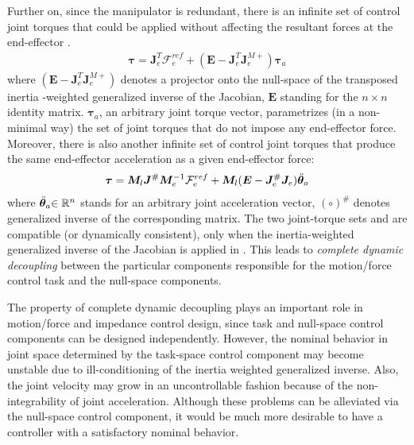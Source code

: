 Further on, since the manipulator is redundant, there is an infinite set of control joint torques
that could be applied without affecting the resultant forces at the end-effector \cite{Khatib1987}.
%
\begin{align}
  \bm{\tau} = \bm{J}_{e}^{T}\mathcal{F}_{e}^{ref} + (\bm{E} - \bm{J}_{e}^{T}\bm{J}_{e}^{M+})\bm{\tau}_{a}\label{eq:TAU_OS1}
\end{align}
%
where $(\bm{E} - \bm{J}_{e}^{T}\bm{J}_{e}^{M+})$ denotes a projector onto the null-space of the transposed
inertia -weighted generalized inverse of the Jacobian, $\bm{E}$ standing for
the $n \times n$ identity matrix.
$\bm{\tau}_{a}$, an arbitrary joint torque vector,
parametrizes (in a non-minimal way) the set of joint torques that do not impose
any end-effector force.
Moreover, there is also another infinite set of control joint torques that produce the same
end-effector acceleration as a given end-effector force:
%
\begin{align}
  \bm{\tau} = \bm{M}_{l}\bm{J}^{\#}\bm{M}_{e}^{-1}\mathcal{F}_{e}^{ref} +
  \bm{M}_{l}(\bm{E} - \bm{J}_{e}^{\#}\bm{J}_{e}){\ddot{\bm{\theta}}}_{a}\label{eq:TAU_OS2}
\end{align}
%
where ${\ddot{\bm{\theta}}}_{a}{\in\mathbb{R}^{n}}$ stands for an arbitrary joint acceleration vector,
$(\circ)^{\#}$ denotes generalized inverse of the corresponding matrix.
The two joint-torque sets  and  are compatible (or dynamically consistent),
only when the inertia-weighted generalized inverse of the Jacobian is applied in .
This leads to \textit{complete dynamic decoupling} between the particular components
responsible for the motion/force control task and the null-space components.

The property of complete dynamic decoupling plays an important role in motion/force
and impedance control design, since task and null-space control components can be designed
independently.
However, the nominal behavior in joint space determined by the task-space control component
may become unstable due to ill-conditioning of the inertia weighted generalized inverse.
Also, the joint velocity may grow in an uncontrollable fashion because of the non-integrability of
joint acceleration. Although these problems can be alleviated via the null-space control component,
it would be much more desirable to have a controller with a satisfactory nominal behavior.

